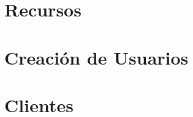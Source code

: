 \documentclass[letterpaper]{article}
\begin{document}


\tableofcontents{}

\newpage{}

\section{Recursos}\label{sec:recursos}



\newpage{}

\section{Creación de Usuarios}\label{sec:cusuarios}



\newpage{}

\section{Clientes}\label{sec:clientes}


\end{document}

